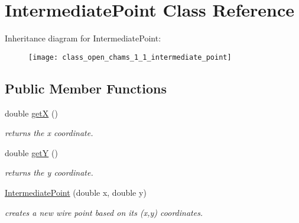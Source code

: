\hypertarget{class_open_chams_1_1_intermediate_point}{\section{Intermediate\-Point Class Reference}
\label{class_open_chams_1_1_intermediate_point}
}
Inheritance diagram for Intermediate\-Point\-:\begin{figure}[H]
\begin{center}
\leavevmode
\texttt{[image: class\_open\_chams\_1\_1\_intermediate\_point]}
\end{center}
\end{figure}
\subsection*{Public Member Functions}
\begin{DoxyCompactItemize}
\item 
\hypertarget{class_open_chams_1_1_intermediate_point_a2b69e4312b7814c6efce42f851893409}{double \hyperlink{class_open_chams_1_1_intermediate_point_a2b69e4312b7814c6efce42f851893409}{get\-X} ()}\label{class_open_chams_1_1_intermediate_point_a2b69e4312b7814c6efce42f851893409}

\begin{DoxyCompactList}\small\item\em returns the x coordinate. \end{DoxyCompactList}\item 
\hypertarget{class_open_chams_1_1_intermediate_point_a15f19cf52955c8c3406831b288681358}{double \hyperlink{class_open_chams_1_1_intermediate_point_a15f19cf52955c8c3406831b288681358}{get\-Y} ()}\label{class_open_chams_1_1_intermediate_point_a15f19cf52955c8c3406831b288681358}

\begin{DoxyCompactList}\small\item\em returns the y coordinate. \end{DoxyCompactList}\item 
\hyperlink{class_open_chams_1_1_intermediate_point_ad8d801adfda3af856c5d1287c8bc0635}{Intermediate\-Point} (double x, double y)
\begin{DoxyCompactList}\small\item\em creates a new wire point based on its (x,y) coordinates. \end{DoxyCompactList}\end{DoxyCompactItemize}


